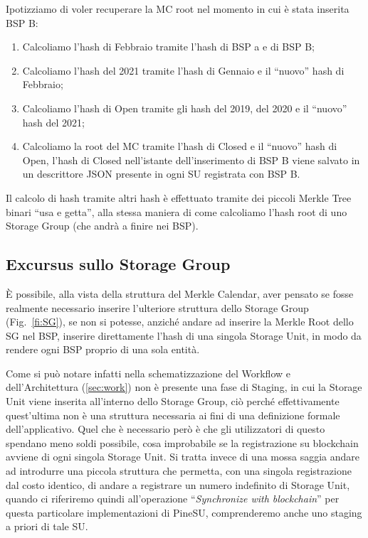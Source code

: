 Ipotizziamo di voler recuperare la MC root nel momento in cui è stata inserita BSP B:
\begin{enumerate}
    \item Calcoliamo l’hash di Febbraio tramite l’hash di BSP a e di BSP B;
    \item Calcoliamo l’hash del 2021 tramite l’hash di Gennaio e il “nuovo” hash di Febbraio;
    \item Calcoliamo l’hash di Open tramite gli hash del 2019, del 2020 e il “nuovo” hash del 2021;
    \item Calcoliamo la root del MC tramite l’hash di Closed e il “nuovo” hash di Open, l’hash di Closed nell’istante dell’inserimento di BSP B viene salvato in un descrittore JSON presente in ogni SU registrata con BSP B.
\end{enumerate}
Il calcolo di hash tramite altri hash è effettuato tramite dei piccoli Merkle Tree binari “usa e getta”, alla stessa maniera di come calcoliamo l’hash root di uno Storage Group (che andrà a finire nei BSP).

\subsection{Excursus sullo Storage Group}
\label{sub:stage1}
È possibile, alla vista della struttura del Merkle Calendar, aver pensato se fosse realmente
necessario inserire l’ulteriore struttura dello Storage Group (Fig.~\ref{fi:SG}), se non si potesse,
anziché andare ad inserire la Merkle Root dello SG nel BSP, inserire direttamente
l’hash di una singola Storage Unit, in modo da rendere ogni BSP proprio di una sola entità.

Come si può notare infatti nella schematizzazione del Workflow e dell’Architettura
(\autoref{sec:work}) non è presente una fase di Staging, in cui la Storage Unit viene
inserita all’interno dello Storage Group, ciò perché effettivamente quest’ultima non è
una struttura necessaria ai fini di una definizione formale dell’applicativo.
Quel che è necessario però è che gli utilizzatori di questo spendano meno soldi possibile,
cosa improbabile se la registrazione su blockchain avviene di ogni singola Storage Unit.
Si tratta invece di una mossa saggia andare ad introdurre una piccola struttura che permetta,
con una singola registrazione dal costo identico, di andare a registrare un numero
indefinito di Storage Unit, quando ci riferiremo quindi all’operazione
“\emph{Synchronize with blockchain}” per questa particolare implementazioni di PineSU,
comprenderemo anche uno staging a priori di tale SU.

